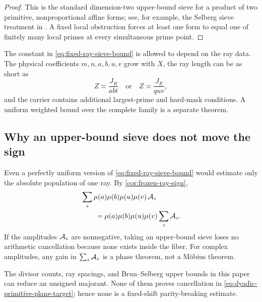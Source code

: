 \begin{proof}
This is the standard dimension-two upper-bound sieve for a product of
two primitive, nonproportional affine forms; see, for example, the
Selberg sieve treatment in \citep{IwaniecKowalski2004}.  A fixed local
obstruction forces at least one form to equal one of finitely many local
primes at every simultaneous prime point.
\end{proof}

\begin{remark}
\label{rem:sieve-nonuniform}
The constant in \eqref{eq:fixed-ray-sieve-bound} is allowed to depend on
the ray data.  The physical coefficients \(m,n,a,b,u,v\) grow with \(X\),
the ray length can be as short as
\[
 Z\asymp \frac{J_R}{abt}
 \quad\text{or}\quad
 Z\asymp \frac{J_E}{quv},
\]
and the carrier contains additional largest-prime and hard-mask
conditions.  A uniform weighted bound over the complete family is a
separate theorem.
\end{remark}

\subsection{Why an upper-bound sieve does not move the sign}

Even a perfectly uniform version of \eqref{eq:fixed-ray-sieve-bound}
would estimate only the absolute population of one ray.  By
\cref{cor:frozen-ray-sign},
\begin{equation}
\begin{aligned}
 &\sum_{z}
 \mu(a)\mu(b)\mu(u)\mu(v)\,
 \mathcal A_z\\
 &\qquad =
 \mu(a)\mu(b)\mu(u)\mu(v)\sum_z\mathcal A_z.
\end{aligned}
\label{eq:sieve-sign-factor-out}
\end{equation}
If the amplitudes \(\mathcal A_z\) are nonnegative, taking an upper-bound sieve
loses no arithmetic cancellation because none exists inside the fiber.
For complex amplitudes, any gain in \(\sum_z\mathcal A_z\) is a phase theorem,
not a M\"obius theorem.

\begin{corollary}
\label{cor:unsigned-not-parity}
The divisor counts, ray spacings, and Brun--Selberg upper bounds in this
paper can reduce an unsigned majorant.  None of them proves cancellation
in \eqref{eq:dyadic-primitive-plane-target}; hence none is a fixed-shift
parity-breaking estimate.
\end{corollary}
